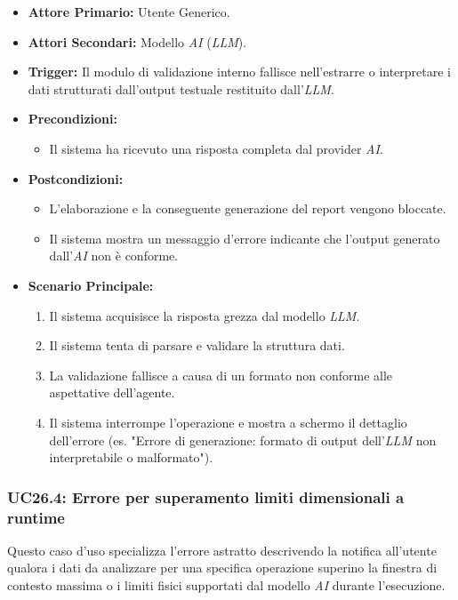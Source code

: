 \documentclass[12pt, a4paper]{article}
\begin{document}
\begin{itemize}
    \item \textbf{Attore Primario:} Utente Generico.
    \item \textbf{Attori Secondari:} Modello \textit{AI} (\textit{LLM}).
    \item \textbf{Trigger:} Il modulo di validazione interno fallisce nell'estrarre o interpretare i dati strutturati dall'output testuale restituito dall'\textit{LLM}.
    \item \textbf{Precondizioni:}
    \begin{itemize}
        \item Il sistema ha ricevuto una risposta completa dal provider \textit{AI}.
    \end{itemize}
    \item \textbf{Postcondizioni:}
    \begin{itemize}
        \item L'elaborazione e la conseguente generazione del report vengono bloccate.
        \item Il sistema mostra un messaggio d'errore indicante che l'output generato dall'\textit{AI} non è conforme.
    \end{itemize}
    \item \textbf{Scenario Principale:}
    \begin{enumerate}
        \item Il sistema acquisisce la risposta grezza dal modello \textit{LLM}.
        \item Il sistema tenta di parsare e validare la struttura dati.
        \item La validazione fallisce a causa di un formato non conforme alle aspettative dell'agente.
        \item Il sistema interrompe l'operazione e mostra a schermo il dettaglio dell'errore (es. "Errore di generazione: formato di output dell'\textit{LLM} non interpretabile o malformato").
    \end{enumerate}
\end{itemize}

\subsubsection{UC26.4: Errore per superamento limiti dimensionali a runtime}\label{uc:26.4}
Questo caso d'uso specializza l'errore astratto descrivendo la notifica all'utente qualora i dati da analizzare per una specifica operazione superino la finestra di contesto massima o i limiti fisici supportati dal modello \textit{AI} durante l'esecuzione.
\end{document}
